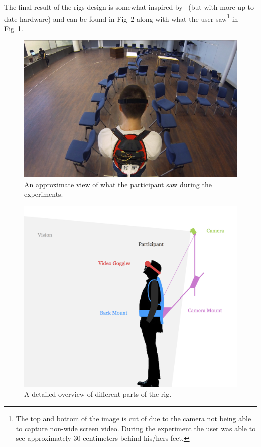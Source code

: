 \documentclass[runningheads,a4paper,oribibl]{llncs}
\begin{document}
The final result of the rigs design is somewhat inspired by~\cite{salamin2010quantifying} (but with more up-to-date hardware) and can be found in Fig~\ref{fig:RigDesign} along with what the user saw\footnote{The top and bottom of the image is cut of due to the camera not being able to capture non-wide screen video. During the experiment the user was able to see approximately 30 centimeters behind his/hers feet.} in Fig~\ref{fig:3Pview}.





\begin{figure}
   \centering
   \includegraphics[width=\textwidth]{ExternalMaterial/3Pview}

   \caption{An approximate view of what the participant saw during the experiments. \label{fig:3Pview}}
\end{figure}



\begin{figure}
   \centering
   \includegraphics[width=\textwidth]{ExternalMaterial/Rig}
   \caption{A detailed overview of different parts of the rig. \label{fig:RigDesign}}
\end{figure}
\end{document}
